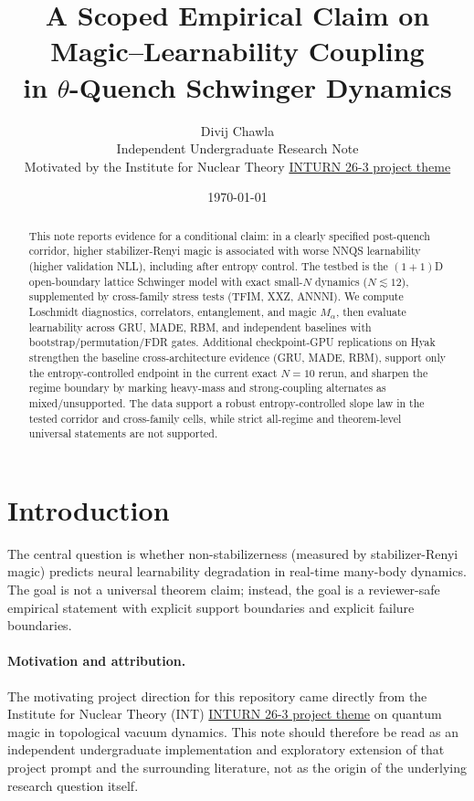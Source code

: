 \documentclass[11pt]{article}
\title{A Scoped Empirical Claim on Magic--Learnability Coupling\\in $\theta$-Quench Schwinger Dynamics}
\author{Divij Chawla\\Independent Undergraduate Research Note\\\small Motivated by the Institute for Nuclear Theory \href{https://www.int.washington.edu/index.php/inturn-26-3}{INTURN 26-3 project theme}}
\date{\today}
\begin{document}
\maketitle

\begin{abstract}
This note reports evidence for a conditional claim: in a clearly specified post-quench corridor, higher stabilizer-Renyi magic is associated with worse NNQS learnability (higher validation NLL), including after entropy control. The testbed is the $(1+1)$D open-boundary lattice Schwinger model with exact small-$N$ dynamics ($N\lesssim 12$), supplemented by cross-family stress tests (TFIM, XXZ, ANNNI). We compute Loschmidt diagnostics, correlators, entanglement, and magic $M_\alpha$, then evaluate learnability across GRU, MADE, RBM, and independent baselines with bootstrap/permutation/FDR gates. Additional checkpoint-GPU replications on Hyak strengthen the baseline cross-architecture evidence (GRU, MADE, RBM), support only the entropy-controlled endpoint in the current exact $N=10$ rerun, and sharpen the regime boundary by marking heavy-mass and strong-coupling alternates as mixed/unsupported. The data support a robust entropy-controlled slope law in the tested corridor and cross-family cells, while strict all-regime and theorem-level universal statements are not supported.
\end{abstract}

\section{Introduction}
The central question is whether non-stabilizerness (measured by stabilizer-Renyi magic) predicts neural learnability degradation in real-time many-body dynamics. The goal is not a universal theorem claim; instead, the goal is a reviewer-safe empirical statement with explicit support boundaries and explicit failure boundaries.

\paragraph{Motivation and attribution.}
The motivating project direction for this repository came directly from the Institute for Nuclear Theory (INT) \href{https://www.int.washington.edu/index.php/inturn-26-3}{INTURN 26-3 project theme} on quantum magic in topological vacuum dynamics. This note should therefore be read as an independent undergraduate implementation and exploratory extension of that project prompt and the surrounding literature, not as the origin of the underlying research question itself.
\end{document}
